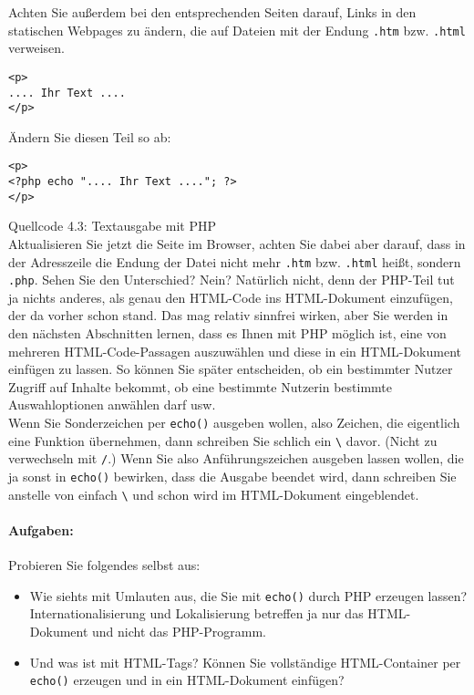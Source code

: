 Achten Sie außerdem bei den entsprechenden Seiten darauf, Links in den statischen Webpages zu ändern, die auf Dateien mit der Endung \verb|.htm| bzw. \verb|.html| verweisen.

\begin{verbatim}
<p>
.... Ihr Text ....
</p>
\end{verbatim}

Ändern Sie diesen Teil so ab:

\begin{verbatim}
<p>
<?php echo ".... Ihr Text ...."; ?>
</p>
\end{verbatim}
Quellcode 4.3: Textausgabe mit PHP\\

Aktualisieren Sie jetzt die Seite im Browser, achten Sie dabei aber darauf, dass in der Adresszeile die Endung der Datei nicht mehr \verb|.htm| bzw. \verb|.html| heißt, sondern \verb|.php|. Sehen Sie den Unterschied? Nein? Natürlich nicht, denn der PHP-Teil  tut ja nichts anderes, als genau den HTML-Code ins HTML-Dokument einzufügen, der da vorher schon stand. Das mag relativ sinnfrei wirken, aber Sie werden in den nächsten Abschnitten lernen, dass es Ihnen mit PHP möglich ist, eine von mehreren HTML-Code-Passagen auszuwählen und diese in ein HTML-Dokument einfügen zu lassen. So können Sie später entscheiden, ob ein bestimmter Nutzer Zugriff auf Inhalte bekommt, ob eine bestimmte Nutzerin bestimmte Auswahloptionen anwählen darf usw.\\

Wenn Sie Sonderzeichen per \verb|echo()| ausgeben wollen, also Zeichen, die eigentlich eine Funktion übernehmen, dann schreiben Sie schlich ein \verb|\| davor. (Nicht zu verwechseln mit \verb|/|.) Wenn Sie also Anführungszeichen ausgeben lassen wollen, die ja sonst in \verb|echo()| bewirken, dass die Ausgabe beendet wird, dann schreiben Sie anstelle von \grqq{} einfach \verb|\|\grqq{} und schon wird \grqq{} im HTML-Dokument eingeblendet.

\paragraph{Aufgaben:}

Probieren Sie folgendes selbst aus:

\begin{itemize}
	\item Wie siehts mit Umlauten aus, die Sie mit \verb|echo()| durch PHP erzeugen lassen? Internationalisierung und Lokalisierung betreffen ja nur das HTML-Dokument und nicht das PHP-Programm.
	
	\item Und was ist mit HTML-Tags? Können Sie vollständige HTML-Container per \verb|echo()| erzeugen und in ein HTML-Dokument einfügen?	
\end{itemize}


